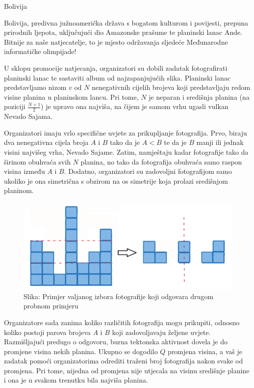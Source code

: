 \begin{statement}[
  problempoints=100,
  timelimit=1 sekunda,
  memorylimit=512 MiB,
]{Bolivija}

Bolivija, predivna južnoamerička država s bogatom kulturom i povijesti, 
prepuna prirodnih ljepota, uključujući dio Amazonske prašume te planinski lanac Ande. 
Bitnije za naše natjecatelje, to je mjesto održavanja sljedeće Međunarodne informatičke 
olimpijade! 

U sklopu promocije natjecanja, organizatori su dobili zadatak 
fotografirati planinski lanac te sastaviti album od najzapanjujućih slika.
Planinski lanac predstavljamo nizom $v$ od $N$ nenegativnih cijelih brojeva koji 
predstavljaju redom visine planina u planinskom lancu. 
Pri tome, $N$ je neparan i središnja planina (na poziciji $\frac{N+1}{2}$) je upravo ona najviša, 
na čijem je samom vrhu ugasli vulkan Nevado Sajama. 

Organizatori imaju vrlo specifične uvjete za prikupljanje fotografija. 
Prvo, biraju dva nenegativna cijela broja $A$ i $B$ tako da je $A < B$ te da je $B$ manji ili 
jednak visini najvišeg vrha, Nevado Sajame. 
Zatim, namještaju kadar fotografije tako da širinom obuhvaća svih $N$ planina, no tako 
da fotografija obuhvaća samo raspon visina između $A$ i $B$. 
Dodatno, organizatori su zadovoljni fotografijom samo ukoliko je ona simetrična s 
obzirom na os simetrije koja prolazi središnjom planinom. 

\begin{figure}[!h]
      \centering
      \includegraphics[width=\linewidth]{pic/planine.png}
      \caption*{Slika: Primjer valjanog izbora fotografije koji odgovara drugom probnom primjeru}
\end{figure}

Organizatore sada zanima koliko različitih fotografija mogu prikupiti, odnosno 
koliko postoji parova brojeva $A$ i $B$ koji zadovoljavaju željene uvjete. 
Razmišljajući predugo o odgovoru, burna tektonska aktivnost dovela je do promjene 
visina nekih planina. Ukupno se dogodilo $Q$ promjena visina, a vaš je zadatak 
pomoći organizatorima odrediti traženi broj fotografija nakon svake od promjena. 
Pri tome, nijedna od promjena nije utjecala na visinu središnje planine i ona je 
u svakom trenutku bila najviša planina. 


\end{statement}
